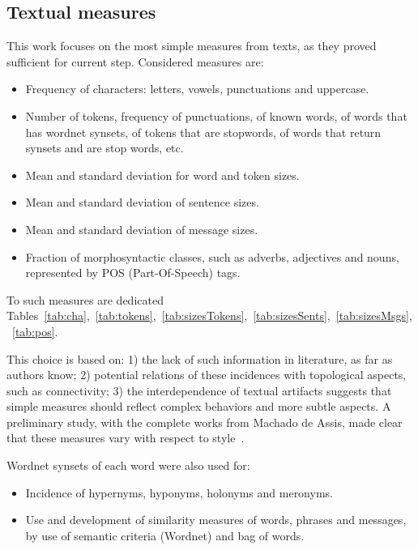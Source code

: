 \documentclass[%
 aip,
 jmp,%
 amsmath,amssymb,
 reprint,%
]{revtex4-1}
\begin{document}

\subsection{Textual measures}
This work focuses on the most simple measures from texts, as they proved sufficient for current step.
Considered measures are:
\begin{itemize}
    \item Frequency of characters: letters, vowels, punctuations and uppercase.
    \item Number of tokens, frequency of punctuations, of known words, of words that has wordnet synsets, of tokens that are stopwords, of words that return synsets and are stop words, etc.
    \item Mean and standard deviation for word and token sizes.
    \item Mean and standard deviation of sentence sizes.
    \item Mean and standard deviation of message sizes.
    \item Fraction of morphosyntactic classes, such as adverbs, adjectives and nouns, represented by POS (Part-Of-Speech) tags.
\end{itemize}
\noindent To such measures are dedicated Tables~\ref{tab:cha},~\ref{tab:tokens},~\ref{tab:sizesTokens},~\ref{tab:sizesSents},~\ref{tab:sizesMsgs},~\ref{tab:pos}.

This choice is based on: 1) the lack of such information in literature, as far as authors know; 
2) potential relations of these incidences with topological aspects, such as connectivity; 3) the interdependence of textual artifacts suggests that simple measures should reflect complex behaviors and more subtle aspects.
A preliminary study, with the complete works from Machado de Assis, made clear that these measures vary with respect to style~\cite{letrasMachado}.

Wordnet synsets of each word were also used for:
\begin{itemize}
    \item Incidence of hypernyms, hyponyms, holonyms and meronyms.
    \item Use and development of similarity measures of words, phrases and messages, by use of semantic criteria (Wordnet) and bag of words.
\end{itemize}
\end{document}
